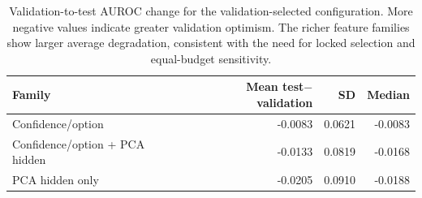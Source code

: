 \begin{table}[t]
\centering
\small
\caption{Validation-to-test AUROC change for the validation-selected configuration. More negative values indicate greater validation optimism. The richer feature families show larger average degradation, consistent with the need for locked selection and equal-budget sensitivity.}
\label{tab:validation-gap}
\begin{tabular}{lrrr}
\toprule
Family & Mean test$-$validation & SD & Median \\
\midrule
Confidence/option & -0.0083 & 0.0621 & -0.0083 \\
Confidence/option + PCA hidden & -0.0133 & 0.0819 & -0.0168 \\
PCA hidden only & -0.0205 & 0.0910 & -0.0188 \\
\bottomrule
\end{tabular}
\end{table}
